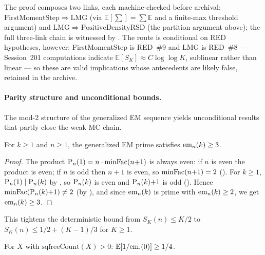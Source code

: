 \noindent The proof composes two links, each machine-checked before
archival: $\mathrm{FirstMomentStep} \Rightarrow \mathrm{LMG}$ (via
$\mathbb{E}[\sum] = \sum\mathbb{E}$ and a finite-max threshold
argument) and $\mathrm{LMG} \Rightarrow \mathrm{PositiveDensityRSD}$
(the partition argument above); the full three-link chain is witnessed
by .
The route is conditional on RED hypotheses, however: FirstMomentStep is
RED~\#9 and LMG is RED~\#8 --- Session~201 computations indicate
$\mathbb{E}[S_K] \approx C\log\log K$, sublinear rather than linear ---
so these are valid implications whose antecedents are likely false,
retained in the archive.

\paragraph{Parity structure and unconditional bounds.}
The mod-2 structure of the generalized EM sequence yields
unconditional results that partly close the weak-MC chain.

\begin{theorem}
\label{thm:genSeq-ge-three}
For $k \geq 1$ and $n \geq 1$, the generalized EM prime satisfies
$\mathrm{em}_{n}(k) \geq 3$.
\end{theorem}

\begin{proof}
The product $\mathrm{P}_{n}(1) = n \cdot \mathrm{minFac}(n{+}1)$ is always even:
if $n$ is even the product is even; if $n$ is odd then $n{+}1$ is
even, so $\mathrm{minFac}(n{+}1) = 2$
().
For $k \geq 1$, $\mathrm{P}_{n}(1) \mid \mathrm{P}_{n}(k)$ by
, so $\mathrm{P}_{n}(k)$ is even and
$\mathrm{P}_{n}(k){+}1$ is odd
().
Hence $\mathrm{minFac}(\mathrm{P}_{n}(k){+}1) \neq 2$
(by ), and since
$\mathrm{em}_{n}(k)$ is prime with $\mathrm{em}_{n}(k) \geq 2$, we get
$\mathrm{em}_{n}(k) \geq 3$.
\end{proof}

This tightens the deterministic bound from $S_K(n) \leq K/2$
to $S_K(n) \leq 1/2 + (K{-}1)/3$ for $K \geq 1$.

\begin{theorem}
\label{thm:k0-quarter}
For $X$ with $\mathrm{sqfreeCount}(X) > 0$:
$\mathbb{E}[1/\mathrm{em}_{\cdot}(0)] \geq 1/4$.
\end{theorem}

